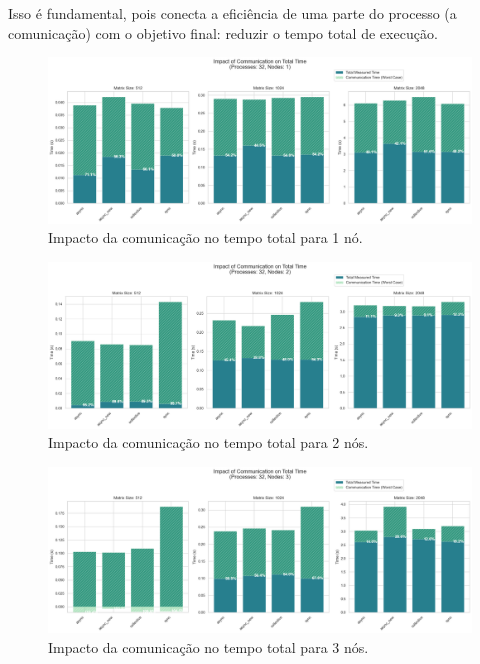 \documentclass{article}
\begin{document}
Isso é fundamental, pois conecta a eficiência de uma parte do processo (a comunicação) com o objetivo final: reduzir o tempo total de execução.

\begin{figure}[H]
    \centering
    \includegraphics[width=1\linewidth]{images/comm_impact_1node.png}
    \caption{Impacto da comunicação no tempo total para 1 nó.}
    \label{fig:impact_1node}
\end{figure}

\begin{figure}[H]
    \centering
    \includegraphics[width=1\linewidth]{images/comm_impact_2nodes.png}
    \caption{Impacto da comunicação no tempo total para 2 nós.}
    \label{fig:impact_2nodes}
\end{figure}

\begin{figure}[H]
    \centering
    \includegraphics[width=1\linewidth]{images/comm_impact_3nodes.png}
    \caption{Impacto da comunicação no tempo total para 3 nós.}
    \label{fig:impact_3nodes}
\end{figure}
\end{document}
